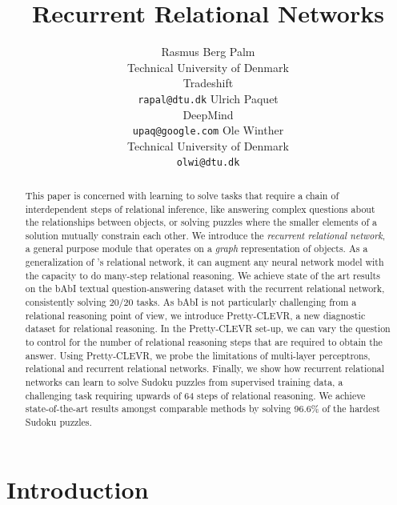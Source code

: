 \documentclass{article}
\title{Recurrent Relational Networks}
\author{Rasmus Berg Palm \\
Technical University of Denmark\\
Tradeshift \\
\texttt{rapal@dtu.dk}
\And Ulrich Paquet \\
DeepMind \\
\texttt{upaq@google.com}
\And Ole Winther \\
Technical University of Denmark \\
\texttt{olwi@dtu.dk}
}
\newcommand{\rbp}[1]{

}
\begin{document}
\maketitle

\begin{abstract}
This paper is concerned with learning to solve tasks that require a chain of interdependent steps of relational inference,
like answering complex questions about the relationships between objects, or 
solving puzzles where the smaller elements of a solution mutually constrain each other.
We introduce the \emph{recurrent relational network},
a general purpose module that operates on a \emph{graph} representation of objects.
As a generalization of \cite{santoro2017simple}'s relational network,
it can augment any neural network model with the capacity to do many-step relational reasoning.
We achieve state of the art results on the bAbI textual question-answering dataset
with the recurrent relational network, consistently solving 20/20 tasks.
As bAbI is not particularly
challenging from a relational reasoning point of view,
we introduce Pretty-CLEVR, a new diagnostic dataset for relational reasoning.
In the Pretty-CLEVR set-up, we can vary the question to control for the number of relational reasoning steps that are required to obtain the answer.
Using Pretty-CLEVR, we probe the limitations of multi-layer perceptrons, relational and recurrent relational networks. 
Finally, we show how recurrent relational networks can learn to solve Sudoku puzzles from supervised training data, a challenging task requiring upwards of 64 steps of relational reasoning. We achieve state-of-the-art results amongst comparable methods by solving 96.6\% of the hardest Sudoku puzzles.
\end{abstract}

\section{Introduction}
\end{document}
